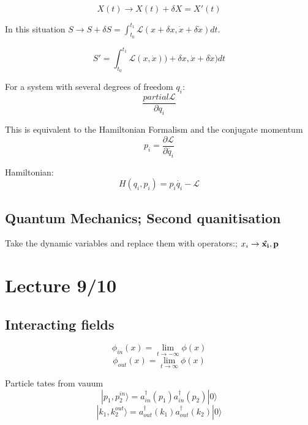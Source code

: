 \documentclass[]{article}
\newcommand{\Lagr}{\mathcal{L}}
\begin{document}
	\begin{equation}
	X(t) \rightarrow X(t) + \delta X = X'(t)
	\end{equation}
	
	In this situation $S \rightarrow S + \delta S = \int_{t_0}^{t_1}\Lagr(x + \delta x, \dot{x} + \delta\dot{x})dt$.
	
	\begin{equation}
	S' =  \int_{t_0}^{t_1}\Lagr(x, \dot{x})) + \delta x, \dot{x} + \delta\dot{x})dt
	\end{equation}
	
	For a system with several degrees of freedom $q_i$:
	\begin{equation}
		\frac{partial\Lagr}{\partial q_i}
	\end{equation}
	
	This is equivalent to the Hamiltonian Formalism and the conjugate momentum
	\begin{equation}
	p_i = \frac{\partial\Lagr}{\partial\dot{q_i}}
	\end{equation}
	
	
	Hamiltonian:
	\begin{equation}
	H(q_i, p_i) = p_i\dot{q_i} - \Lagr
	\end{equation}
	
	\subsection{Quantum Mechanics; Second quanitisation}
	
	Take the dynamic variables and replace them with operators:; $x_i \rightarrow \bf{\hat{x_i}}, \bf{p}$


	\section{Lecture 9/10}
	
	\subsection{Interacting fields}
	
	\begin{equation}
		\phi_{in}(x) = \lim\limits_{t\rightarrow-\infty}\phi(x)
	\end{equation}
	\begin{equation}
	\phi_{out}(x) = \lim\limits_{t\rightarrow\infty}\phi(x)
	\end{equation}
	
	Particle tates from vauum
	\begin{equation}
		|p_1,p_2^{in}\rangle = a^\dagger_{in}(p_1)a^\dagger_{in}(p_2)|0\rangle
	\end{equation}
	\begin{equation}
	|k_1,k_2^{out}\rangle = a^\dagger_{out}(k_1)a^\dagger_{out}(k_2)|0\rangle
	\end{equation}
	
\end{document}
